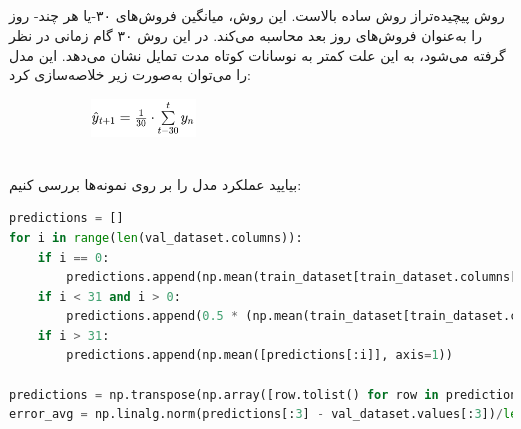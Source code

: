 \documentclass{article}
\begin{document}
\subsection*{}
روش  پیچیده‌تراز روش ساده بالاست. این روش، میانگین فروش‌های ۳۰-یا هر چند- روز را به‌عنوان فروش‌های روز بعد محاسبه می‌کند. در این روش ۳۰ گام زمانی در نظر گرفته می‌شود، به این علت کمتر به نوسانات کوتاه مدت تمایل نشان می‌دهد. این مدل را می‌توان به‌صورت زیر خلاصه‌سازی کرد:
\begin{figure}[hbt!]
	\centering
	\includegraphics[width=5cm,height=1cm]{Outputs/e1.png}
\end{figure}
\ \\
بیایید ‌عملکرد مدل  را بر روی نمونه‌ها بررسی کنیم: 
\begin{latin}
\begin{lstlisting}[language=Python]
predictions = []
for i in range(len(val_dataset.columns)):
	if i == 0:
		predictions.append(np.mean(train_dataset[train_dataset.columns[-30:]].values, axis=1))
	if i < 31 and i > 0:
		predictions.append(0.5 * (np.mean(train_dataset[train_dataset.columns[-30+i:]].values, axis=1 + \ np.mean(predictions[:i], axis=0)))
	if i > 31:
		predictions.append(np.mean([predictions[:i]], axis=1))

predictions = np.transpose(np.array([row.tolist() for row in predictions]))
error_avg = np.linalg.norm(predictions[:3] - val_dataset.values[:3])/len(predictions[0])
\end{lstlisting}
\end{latin}
\end{document}
